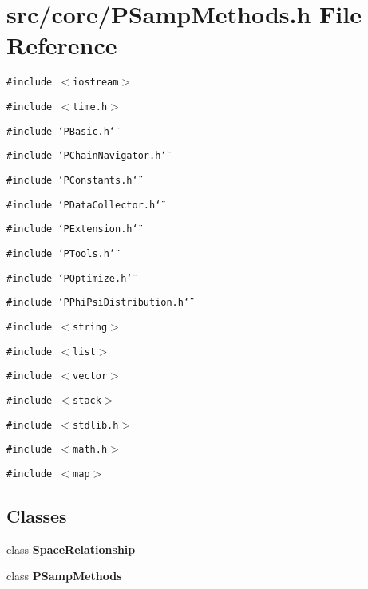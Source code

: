 \section{src/core/PSamp\-Methods.h File Reference}
\label{PSampMethods_8h}


{\tt \#include $<$iostream$>$}\par
{\tt \#include $<$time.h$>$}\par
{\tt \#include \char`\"{}PBasic.h\char`\"{}}\par
{\tt \#include \char`\"{}PChain\-Navigator.h\char`\"{}}\par
{\tt \#include \char`\"{}PConstants.h\char`\"{}}\par
{\tt \#include \char`\"{}PData\-Collector.h\char`\"{}}\par
{\tt \#include \char`\"{}PExtension.h\char`\"{}}\par
{\tt \#include \char`\"{}PTools.h\char`\"{}}\par
{\tt \#include \char`\"{}POptimize.h\char`\"{}}\par
{\tt \#include \char`\"{}PPhi\-Psi\-Distribution.h\char`\"{}}\par
{\tt \#include $<$string$>$}\par
{\tt \#include $<$list$>$}\par
{\tt \#include $<$vector$>$}\par
{\tt \#include $<$stack$>$}\par
{\tt \#include $<$stdlib.h$>$}\par
{\tt \#include $<$math.h$>$}\par
{\tt \#include $<$map$>$}\par
\subsection*{Classes}
\begin{CompactItemize}
\item 
class {\bf Space\-Relationship}
\item 
class {\bf PSamp\-Methods}
\end{CompactItemize}
